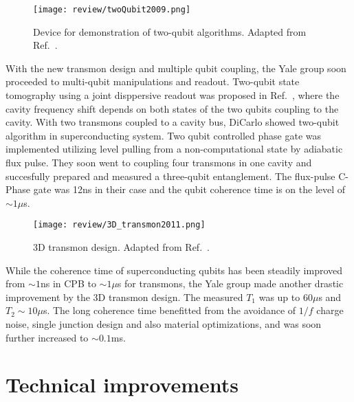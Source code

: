             \begin{figure}[h]
                \centering
                \texttt{[image: review/twoQubit2009.png]}
                \caption{Device for demonstration of two-qubit algorithms. Adapted from Ref.~.}
                \label{fig:twoQubit2009}
            \end{figure}

With the new transmon design and multiple qubit coupling, the Yale group soon proceeded to multi-qubit manipulations and readout. Two-qubit state tomography using a joint disppersive readout was proposed in Ref.~\cite{Filipp2009}, where the cavity frequency shift depends on both states of the two qubits coupling to the cavity. With two transmons coupled to a cavity bus, DiCarlo \etal{} showed two-qubit algorithm in superconducting system\cite{DiCarlo2009}. Two qubit controlled phase gate was implemented utilizing level pulling from a non-computational state by adiabatic flux pulse. They soon went to coupling four transmons in one cavity and succesfully prepared and measured a three-qubit entanglement\cite{DiCarlo2010}. The flux-pulse C-Phase gate was 12ns in their case and the qubit coherence time is on the level of $\sim 1 \mu$s.


            \begin{figure}[h]
                \centering
                \texttt{[image: review/3D\_transmon2011.png]}
                \caption{3D transmon design. Adapted from Ref.~.}
                \label{fig:Paik2011}
            \end{figure}

While the coherence time of superconducting qubits has been steadily improved from $\sim 1$ns in CPB to $\sim 1 \mu$s for transmons, the Yale group made another drastic improvement by the 3D transmon design\cite{Paik2011}. The measured $T_1$ was up to $60\mu$s and $T_2 \sim 10\mu$s. The long coherence time benefitted from the avoidance of $1/f$ charge noise, single junction design and also material optimizations, and was soon further increased to $\sim 0.1$ms\cite{Rigetti2012}.






\section{Technical improvements} %
\label{sec:technical_improvements}

